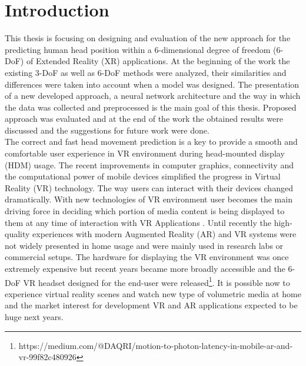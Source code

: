 \chapter{Introduction}
\label{sec:intro}
This thesis is focusing on designing and evaluation of the new approach for the predicting human head position within a 6-dimensional degree of freedom (6-DoF) of Extended Reality (XR) applications. At the beginning of the work the existing 3-DoF \cite{predicting_360,attention_saliency} as well as 6-DoF \cite{6-dof_metrics} methods were analyzed, their similarities and differences \cite{new_challenge} were taken into account when a model was designed. The presentation of a new developed approach, a neural network architecture and the way in which the data was collected and preprocessed is the main goal of this thesis. Proposed approach was evaluated and at the end of the work the obtained results were discussed and the suggestions for future work were done.\\
The correct and fast head movement prediction is a key to provide a smooth and comfortable user experience in VR environment during head-mounted display (HDM) usage. The recent improvements in computer graphics, connectivity and the computational power of mobile devices simplified the progress in Virtual Reality (VR) technology. The way users can interact with their devices changed dramatically. With new technologies of VR environment user becomes the main driving force in deciding which portion of media content is being displayed to them at any time of interaction with VR Applications \cite{new_challenge}. Until recently the high-quality experiences with modern Augmented Reality (AR) and VR systems were not widely presented in home usage and were mainly used in research labs or commercial setups. The hardware for displaying the VR environment was once extremely expensive but recent years became more broadly accessible and the 6-DoF VR headset designed for the end-user were released\footnote{https://medium.com/@DAQRI/motion-to-photon-latency-in-mobile-ar-and-vr-99f82c480926}. It is possible now to experience virtual reality scenes and watch new type of volumetric media at home and the market interest for development VR and AR applications expected to be huge next years.\\
